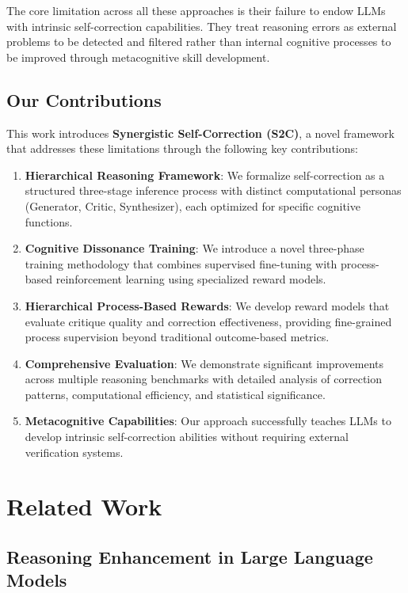 \documentclass[10pt,twocolumn]{article}
\newcommand{\ssc}{\textsc{S2C}}
\begin{document}
The core limitation across all these approaches is their failure to endow LLMs with intrinsic self-correction capabilities. They treat reasoning errors as external problems to be detected and filtered rather than internal cognitive processes to be improved through metacognitive skill development.

\subsection{Our Contributions}

This work introduces \textbf{Synergistic Self-Correction (\ssc{})}, a novel framework that addresses these limitations through the following key contributions:

\begin{enumerate}
\item \textbf{Hierarchical Reasoning Framework}: We formalize self-correction as a structured three-stage inference process with distinct computational personas (Generator, Critic, Synthesizer), each optimized for specific cognitive functions.

\item \textbf{Cognitive Dissonance Training}: We introduce a novel three-phase training methodology that combines supervised fine-tuning with process-based reinforcement learning using specialized reward models.

\item \textbf{Hierarchical Process-Based Rewards}: We develop reward models that evaluate critique quality and correction effectiveness, providing fine-grained process supervision beyond traditional outcome-based metrics.

\item \textbf{Comprehensive Evaluation}: We demonstrate significant improvements across multiple reasoning benchmarks with detailed analysis of correction patterns, computational efficiency, and statistical significance.

\item \textbf{Metacognitive Capabilities}: Our approach successfully teaches LLMs to develop intrinsic self-correction abilities without requiring external verification systems.
\end{enumerate}

\section{Related Work}

\subsection{Reasoning Enhancement in Large Language Models}
\end{document}
